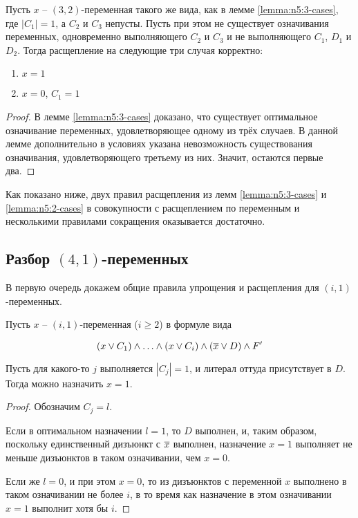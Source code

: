 \begin{lemma}
 Пусть $x$ -- $(3,2)$-переменная такого же вида, как в лемме \ref{lemma:n5:3-cases}, где $|C_1| = 1$, а $C_2$ и $C_3$ непусты. Пусть при этом не существует означивания переменных, одновременно выполняющего $C_2$ и $C_3$ и не выполняющего $C_1$, $D_1$ и $D_2$. Тогда расщепление на следующие три случая корректно:

 \begin{enumerate}
  \item $x = 1$
  \item $x = 0$, $C_1 = 1$
 \end{enumerate}
 \label{lemma:n5:2-cases}
\end{lemma}

\begin{proof}
 В лемме \ref{lemma:n5:3-cases} доказано, что существует оптимальное означивание переменных, удовлетворяющее одному из трёх случаев. В данной лемме дополнительно в условиях указана невозможность существования означивания, удовлетворяющего третьему из них. Значит, остаются первые два.
\end{proof}

Как показано ниже, двух правил расщепления из лемм \ref{lemma:n5:3-cases} и \ref{lemma:n5:2-cases} в совокупности с расщеплением по переменным и несколькими правилами сокращения оказывается достаточно.

\subsection{Разбор $(4,1)$-переменных}
\label{subsec:n5:41}

В первую очередь докажем общие правила упрощения и расщепления для $(i,1)$-переменных.

\begin{rrule}
 Пусть $x$ -- $(i,1)$-переменная ($i \geq 2$) в формуле вида

 $$
  (x \vee C_1) \wedge \ldots \wedge (x \vee C_i) \wedge (\overline{x} \vee D) \wedge F'
 $$

 Пусть для какого-то $j$ выполняется $|C_j| = 1$, и литерал оттуда присутствует в $D$. Тогда можно назначить $x = 1$.
 \label{rrule:n5:i1}
\end{rrule}

\begin{proof}
 Обозначим $C_j = l$.

 Если в оптимальном назначении $l = 1$, то $D$ выполнен, и, таким образом, поскольку единственный дизъюнкт с $\overline{x}$ выполнен, назначение $x = 1$ выполняет не меньше дизъюнктов в таком означивании, чем $x = 0$.

 Если же $l = 0$, и при этом $x = 0$, то из дизъюнктов с переменной $x$ выполнено в таком означивании не более $i$, в то время как назначение в этом означивании $x = 1$ выполнит хотя бы $i$.
\end{proof}

